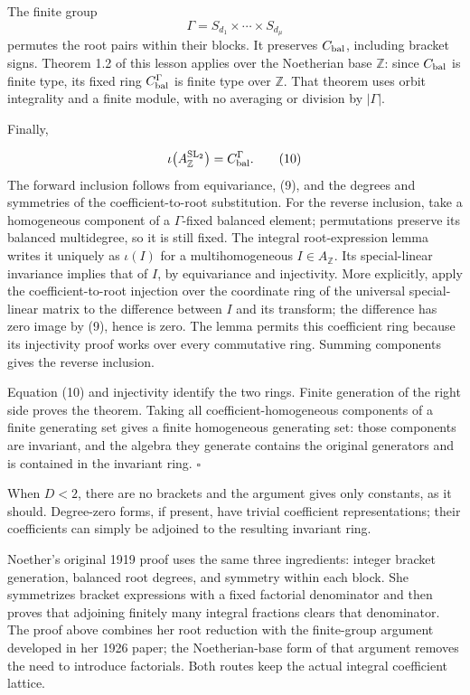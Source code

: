 \documentclass[
]{article}
\begin{document}
The finite group \[
\Gamma=S_{d_1}\times\cdots\times S_{d_\mu}
\] permutes the root pairs within their blocks. It preserves
\(C_{\rm bal}\), including bracket signs. Theorem 1.2 of this lesson
applies over the Noetherian base \(\mathbb Z\): since \(C_{\rm bal}\) is
finite type, its fixed ring \(C_{\rm bal}^{\Gamma}\) is finite type over
\(\mathbb Z\). That theorem uses orbit integrality and a finite module,
with no averaging or division by \(|\Gamma|\).

Finally, \protect{}\label{equation-10}{}

\[
\iota\bigl(A_{\mathbb Z}^{\operatorname{SL}_2}\bigr)
=C_{\rm bal}^{\Gamma}.
\tag{10}
\] The forward inclusion follows from equivariance, (9), and the degrees
and symmetries of the coefficient-to-root substitution. For the reverse
inclusion, take a homogeneous component of a \(\Gamma\)-fixed balanced
element; permutations preserve its balanced multidegree, so it is still
fixed. The integral root-expression lemma writes it uniquely as
\(\iota(I)\) for a multihomogeneous \(I\in A_{\mathbb Z}\). Its
special-linear invariance implies that of \(I\), by equivariance and
injectivity. More explicitly, apply the coefficient-to-root injection
over the coordinate ring of the universal special-linear matrix to the
difference between \(I\) and its transform; the difference has zero
image by (9), hence is zero. The lemma permits this coefficient ring
because its injectivity proof works over every commutative ring. Summing
components gives the reverse inclusion.

Equation (10) and injectivity identify the two rings. Finite generation
of the right side proves the theorem. Taking all coefficient-homogeneous
components of a finite generating set gives a finite homogeneous
generating set: those components are invariant, and the algebra they
generate contains the original generators and is contained in the
invariant ring. \(\square\)

When \(D<2\), there are no brackets and the argument gives only
constants, as it should. Degree-zero forms, if present, have trivial
coefficient representations; their coefficients can simply be adjoined
to the resulting invariant ring.

Noether's original 1919 proof uses the same three ingredients: integer
bracket generation, balanced root degrees, and symmetry within each
block. She symmetrizes bracket expressions with a fixed factorial
denominator and then proves that adjoining finitely many integral
fractions clears that denominator. The proof above combines her root
reduction with the finite-group argument developed in her 1926 paper;
the Noetherian-base form of that argument removes the need to introduce
factorials. Both routes keep the actual integral coefficient lattice.
\end{document}
